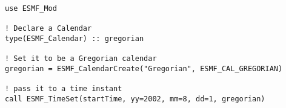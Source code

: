 
\begin{verbatim}
use ESMF_Mod

! Declare a Calendar
type(ESMF_Calendar) :: gregorian

! Set it to be a Gregorian calendar
gregorian = ESMF_CalendarCreate("Gregorian", ESMF_CAL_GREGORIAN)

! pass it to a time instant
call ESMF_TimeSet(startTime, yy=2002, mm=8, dd=1, gregorian)
\end{verbatim}
